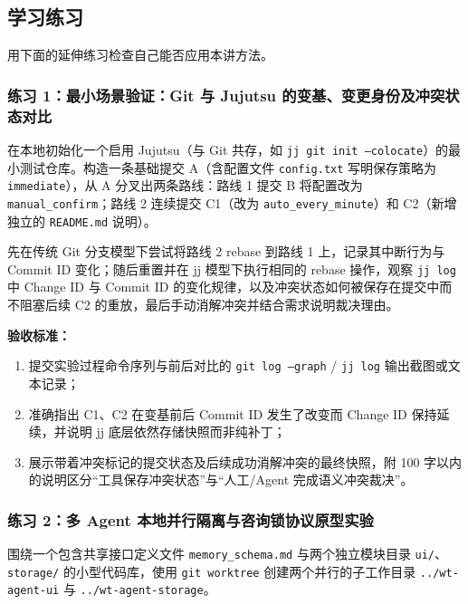 \documentclass[UTF8,a4paper,11pt,fontset=fandol]{ctexart}
\begin{document}
\subsection{学习练习}

用下面的延伸练习检查自己能否应用本讲方法。

\subsubsection*{练习 1：最小场景验证：Git 与 Jujutsu 的变基、变更身份及冲突状态对比}

在本地初始化一个启用 Jujutsu（与 Git 共存，如 \texttt{jj git init --colocate}）的最小测试仓库。构造一条基础提交 A（含配置文件 \texttt{config.txt} 写明保存策略为 \texttt{immediate}），从 A 分叉出两条路线：路线 1 提交 B 将配置改为 \texttt{manual\_confirm}；路线 2 连续提交 C1（改为 \texttt{auto\_every\_minute}）和 C2（新增独立的 \texttt{README.md} 说明）。

先在传统 Git 分支模型下尝试将路线 2 rebase 到路线 1 上，记录其中断行为与 Commit ID 变化；随后重置并在 jj 模型下执行相同的 rebase 操作，观察 \texttt{jj log} 中 Change ID 与 Commit ID 的变化规律，以及冲突状态如何被保存在提交中而不阻塞后续 C2 的重放，最后手动消解冲突并结合需求说明裁决理由。

\par{}\textbf{验收标准：}

\begin{enumerate}
\item 提交实验过程命令序列与前后对比的 \texttt{git log --graph} / \texttt{jj log} 输出截图或文本记录；

\item 准确指出 C1、C2 在变基前后 Commit ID 发生了改变而 Change ID 保持延续，并说明 jj 底层依然存储快照而非纯补丁；

\item 展示带着冲突标记的提交状态及后续成功消解冲突的最终快照，附 100 字以内的说明区分“工具保存冲突状态”与“人工/Agent 完成语义冲突裁决”。
\end{enumerate}

\subsubsection*{练习 2：多 Agent 本地并行隔离与咨询锁协议原型实验}

围绕一个包含共享接口定义文件 \texttt{memory\_schema.md} 与两个独立模块目录 \texttt{ui/}、\texttt{storage/} 的小型代码库，使用 \texttt{git worktree} 创建两个并行的子工作目录 \texttt{../wt-agent-ui} 与 \texttt{../wt-agent-storage}。
\end{document}
